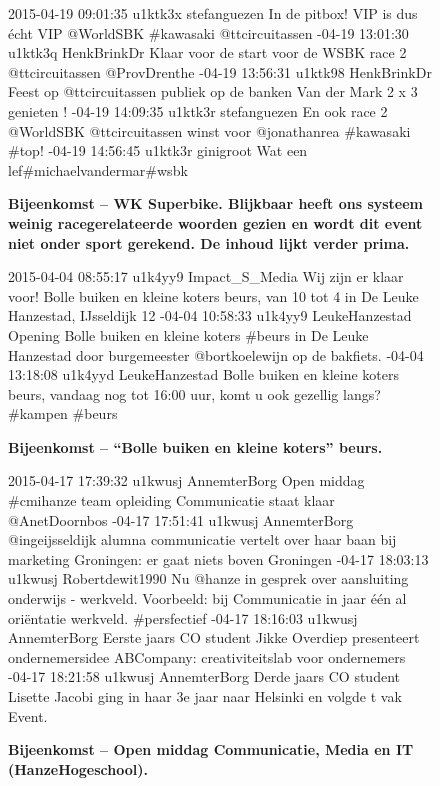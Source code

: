 {{\vspace*{-17pt} 
\begin{figure}[H]
 \caption{\bf{Bijeenkomst} – WK Superbike. Blijkbaar heeft ons systeem weinig racegerelateerde woorden gezien en wordt dit event niet onder sport gerekend. De inhoud lijkt verder prima.}
\vspace*{-10pt} 
\begin{framed}
\footnotesize{
2015-04-19 09:01:35 u1ktk3x stefanguezen In de pitbox! VIP is dus écht VIP @WorldSBK \#kawasaki @ttcircuitassen
-04-19 13:01:30 u1ktk3q HenkBrinkDr Klaar voor de start voor de WSBK race 2 @ttcircuitassen @ProvDrenthe
-04-19 13:56:31 u1ktk98 HenkBrinkDr Feest op @ttcircuitassen publiek op de banken Van der Mark 2 x 3 genieten !
-04-19 14:09:35 u1ktk3r stefanguezen En ook race 2 @WorldSBK @ttcircuitassen winst voor @jonathanrea \#kawasaki \#top!
-04-19 14:56:45 u1ktk3r ginigroot Wat een lef\#michaelvandermar\#wsbk}
\end{framed}
\end{figure}

\vspace*{-17pt} 
\begin{figure}[H]
 \caption{\bf{Bijeenkomst} – ``Bolle buiken en kleine koters'' beurs.}
\vspace*{-10pt} 
\begin{framed}
\footnotesize{
2015-04-04 08:55:17 u1k4yy9 Impact\_S\_Media Wij zijn er klaar voor! Bolle buiken en kleine koters beurs, van 10 tot 4 in De Leuke Hanzestad, IJsseldijk 12
-04-04 10:58:33 u1k4yy9 LeukeHanzestad Opening Bolle buiken en kleine koters \#beurs in De Leuke Hanzestad door burgemeester @bortkoelewijn op de bakfiets.
-04-04 13:18:08 u1k4yyd LeukeHanzestad Bolle buiken en kleine koters beurs, vandaag nog tot 16:00 uur, komt u ook gezellig langs? \#kampen \#beurs}
\end{framed}
\end{figure}
 
\begin{figure}[H]
 \caption{\bf{Bijeenkomst} – Open middag Communicatie, Media en IT (HanzeHogeschool).}
\vspace*{-10pt} 
\begin{framed}
\footnotesize{
2015-04-17 17:39:32 u1kwusj AnnemterBorg Open middag \#cmihanze team opleiding Communicatie staat klaar @AnetDoornbos
-04-17 17:51:41 u1kwusj AnnemterBorg @ingeijsseldijk alumna communicatie vertelt over haar baan bij marketing Groningen: er gaat niets boven Groningen
-04-17 18:03:13 u1kwusj Robertdewit1990 Nu @hanze in gesprek over aansluiting onderwijs - werkveld. Voorbeeld: bij Communicatie in jaar één al oriëntatie werkveld. \#persfectief
-04-17 18:16:03 u1kwusj AnnemterBorg Eerste jaars CO student Jikke Overdiep presenteert ondernemersidee ABCompany: creativiteitslab voor ondernemers
-04-17 18:21:58 u1kwusj AnnemterBorg Derde jaars CO student Lisette Jacobi ging in haar 3e jaar naar Helsinki en volgde t vak Event.
}
\end{framed}
\end{figure}

}}
